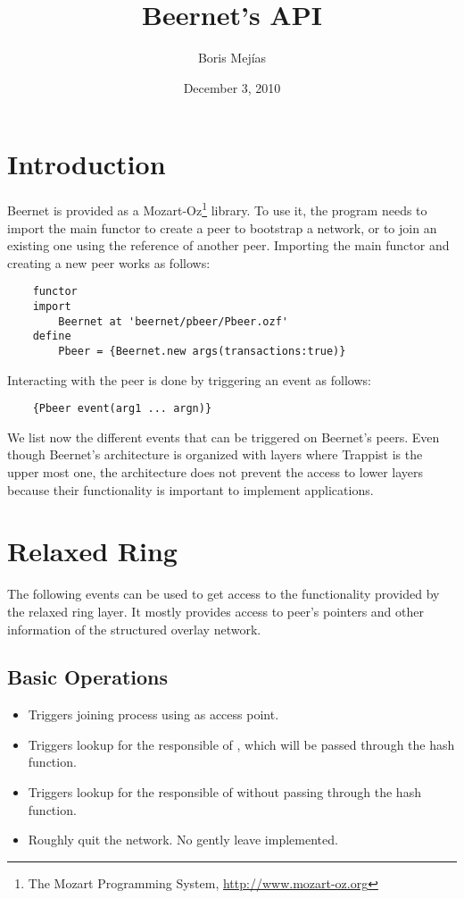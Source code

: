 \documentclass[11pt]{article}
\title{Beernet's API}
\author{Boris Mej\'{i}as}
\date{December 3, 2010}
\begin{document}
\maketitle

\section{Introduction}

Beernet is provided as a Mozart-Oz\footnote{The Mozart Programming System,
\url{http://www.mozart-oz.org}} library. To use it, the program needs to
import the main functor to create a peer to bootstrap a network, or to join an
existing one using the reference of another peer. Importing the main functor
and creating a new peer works as follows:

\begin{lstlisting}
	functor
	import
		Beernet at 'beernet/pbeer/Pbeer.ozf'
	define
		Pbeer = {Beernet.new args(transactions:true)}
\end{lstlisting}

Interacting with the peer is done by triggering an event as follows:

\begin{lstlisting}
	{Pbeer event(arg1 ... argn)}
\end{lstlisting}

We list now the different events that can be triggered on Beernet's peers.
Even though Beernet's architecture is organized with layers where Trappist is
the upper most one, the architecture does not prevent the access to lower
layers because their functionality is important to implement applications.

\section{Relaxed Ring}

The following events can be used to get access to the functionality provided
by the relaxed ring layer. It mostly provides access to peer's pointers and
other information of the structured overlay network. 

\subsection{Basic Operations}

\begin{itemize}

	\item {} Triggers joining process using 
as access point.

	\item {} Triggers lookup for the responsible of
, which will be passed through the hash function.

	\item {} Triggers lookup for the responsible of
 without passing  through the hash function.

	\item {} Roughly quit the network. No gently leave implemented.
 
\end{itemize}
\end{document}
